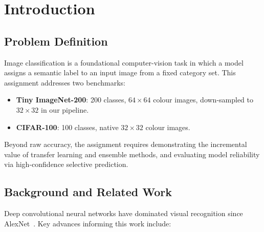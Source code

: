 \documentclass[11pt,letterpaper]{article}
\begin{document}
\section{Introduction}

\subsection{Problem Definition}

Image classification is a foundational computer-vision task in which a model
assigns a semantic label to an input image from a fixed category set.
This assignment addresses two benchmarks:
\begin{itemize}[noitemsep]
  \item \textbf{Tiny ImageNet-200}: 200 classes, $64\!\times\!64$ colour images,
        down-sampled to $32\!\times\!32$ in our pipeline.
  \item \textbf{CIFAR-100}: 100 classes, native $32\!\times\!32$ colour images.
\end{itemize}
Beyond raw accuracy, the assignment requires demonstrating the incremental value of
transfer learning and ensemble methods, and evaluating model reliability via
high-confidence selective prediction.

\subsection{Background and Related Work}

Deep convolutional neural networks have dominated visual recognition since
AlexNet~\cite{krizhevsky2012imagenet}.
Key advances informing this work include:
\end{document}
